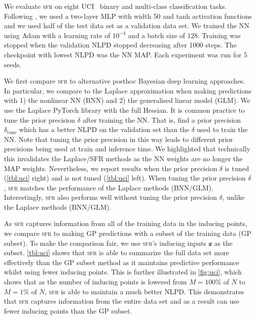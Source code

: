 \documentclass{article}
\newcommand{\our}{\textsc{sfr}\xspace}
\newcommand{\mbf}[1]{\mathbf{#1}}
\newcommand{\vz}{\mbf{z}}
\begin{document}
%
We evaluate \our on eight UCI~\citep{UCI} binary and multi-class classification tasks.
Following \citet{immer2021improving}, we used a two-layer MLP with width 50 and tanh activation functions and we used half of the test data set as a validation data set.
We trained the NN using Adam \cite{adam} with a learning rate of $10^{-4}$ and a batch size of $128$.
Training was stopped when the validation NLPD stopped decreasing after 1000 steps.
The checkpoint with lowest NLPD was the NN MAP.
Each experiment was run for $5$ seeds.

We first compare \our to alternative posthoc Bayesian deep learning approaches.
In particular, we compare to the Laplace approximation when making predictions with 1) the nonlinear NN (BNN) and 2) the generalised linear model (GLM).
We use the Laplace PyTorch library \citep{daxberger2021laplace} with the full Hessian.%
It is common practice to tune the prior precision $\delta$ after training the NN.
That is, find a prior precision $\delta_{\text{tune}}$ which has a better NLPD on the validation set than the $\delta$ used to train the NN.
Note that tuning the prior precision in this way leads to different prior precisions being used at train and inference time.
We highlighted that technically this invalidates the Laplace/SFR methods as the NN weights are no longer the MAP weights.
Nevertheless, we report results when the prior precision $\delta$ is tuned (\cref{tbl:uci} right) and is not tuned (\cref{tbl:uci} left).
When tuning the prior precision $\delta$, \our matches the performance of the Laplace methods (BNN/GLM).
Interestingly, \our also  performs well without tuning the prior precision $\delta$, unlike the Laplace methods (BNN/GLM).

As \our captures information from all of the training data in the inducing points, we compare \our to making GP predictions with a subset of the training data (GP subset).
To make the comparison fair, we use \our's inducing inputs $\vz$ as the subset.
\cref{tbl:uci} shows that \our is able to summarize the full data set more effectively than the GP subset method as it maintains predictive performance
whilst using fewer inducing points.
This is further illustrated in \cref{fig:uci}, which shows that as the number of inducing points is lowered from $M=100\%$ of $N$ to $M=1\%$ of $N$,
\our is able to maintain a much better NLPD.
This demonstrates that \our  captures information from the entire data set and as a result can use fewer inducing points than the GP subset.
\end{document}
